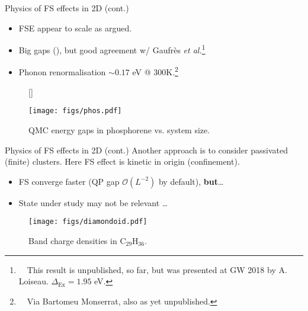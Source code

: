 \documentclass[12pt, pdf, hyperref={draft}, usenames, dvipsnames]{beamer}
\newcommand{\red}[1]{{\bf\color{LancsRed}{#1}}}
\begin{document}
\begin{frame}{Physics of FS effects in 2D (cont.)}
  \begin{itemize}
    \item FSE appear to scale as argued.
    \item Big gaps (\red{$\epsilon$!}), but good agreement
    w/ Gaufr\`{e}s \textit{et
    al.}\footnote{~~This result is unpublished, so far, but was presented at GW
    2018 by A. Loiseau. $\Delta_{\text{Ex}} = 1.95$ eV.}
    \item Phonon renormalisation $\sim 0.17$ eV @ 300K.\footnote{~~Via
    Bartomeu Monserrat, also as yet unpublished.}
  \end{itemize}
\begin{figure}[H]
  [\FBwidth]
  {\caption{QMC energy gaps in phosphorene vs. system size.}\label{fig:phos}}
  {\texttt{[image: figs/phos.pdf]}}
\end{figure}
\end{frame}

\begin{frame}{Physics of FS effects in 2D (cont.)}
Another approach is to consider passivated (finite) clusters. Here FS effect
is kinetic in origin (confinement).
\begin{itemize}
  \item FS converge faster (QP gap $\mathcal{O}(L^{-2})$ by default), {\bf but}\ldots
  \item State under study may not be relevant %
  \ldots
\end{itemize}
\begin{figure}[H]
  \centering
  \texttt{[image: figs/diamondoid.pdf]}
  \caption{Band charge densities in C$_{29}$H$_{36}$.}
\label{fig:diamondoid}
\end{figure}
\end{frame}
\end{document}
